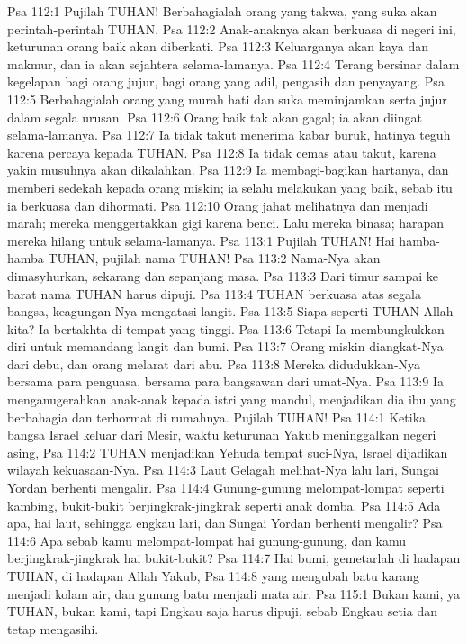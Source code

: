 Psa 112:1  Pujilah TUHAN! Berbahagialah orang yang takwa, yang suka akan perintah-perintah TUHAN.
Psa 112:2  Anak-anaknya akan berkuasa di negeri ini, keturunan orang baik akan diberkati.
Psa 112:3  Keluarganya akan kaya dan makmur, dan ia akan sejahtera selama-lamanya.
Psa 112:4  Terang bersinar dalam kegelapan bagi orang jujur, bagi orang yang adil, pengasih dan penyayang.
Psa 112:5  Berbahagialah orang yang murah hati dan suka meminjamkan serta jujur dalam segala urusan.
Psa 112:6  Orang baik tak akan gagal; ia akan diingat selama-lamanya.
Psa 112:7  Ia tidak takut menerima kabar buruk, hatinya teguh karena percaya kepada TUHAN.
Psa 112:8  Ia tidak cemas atau takut, karena yakin musuhnya akan dikalahkan.
Psa 112:9  Ia membagi-bagikan hartanya, dan memberi sedekah kepada orang miskin; ia selalu melakukan yang baik, sebab itu ia berkuasa dan dihormati.
Psa 112:10  Orang jahat melihatnya dan menjadi marah; mereka menggertakkan gigi karena benci. Lalu mereka binasa; harapan mereka hilang untuk selama-lamanya.
Psa 113:1  Pujilah TUHAN! Hai hamba-hamba TUHAN, pujilah nama TUHAN!
Psa 113:2  Nama-Nya akan dimasyhurkan, sekarang dan sepanjang masa.
Psa 113:3  Dari timur sampai ke barat nama TUHAN harus dipuji.
Psa 113:4  TUHAN berkuasa atas segala bangsa, keagungan-Nya mengatasi langit.
Psa 113:5  Siapa seperti TUHAN Allah kita? Ia bertakhta di tempat yang tinggi.
Psa 113:6  Tetapi Ia membungkukkan diri untuk memandang langit dan bumi.
Psa 113:7  Orang miskin diangkat-Nya dari debu, dan orang melarat dari abu.
Psa 113:8  Mereka didudukkan-Nya bersama para penguasa, bersama para bangsawan dari umat-Nya.
Psa 113:9  Ia menganugerahkan anak-anak kepada istri yang mandul, menjadikan dia ibu yang berbahagia dan terhormat di rumahnya. Pujilah TUHAN!
Psa 114:1  Ketika bangsa Israel keluar dari Mesir, waktu keturunan Yakub meninggalkan negeri asing,
Psa 114:2  TUHAN menjadikan Yehuda tempat suci-Nya, Israel dijadikan wilayah kekuasaan-Nya.
Psa 114:3  Laut Gelagah melihat-Nya lalu lari, Sungai Yordan berhenti mengalir.
Psa 114:4  Gunung-gunung melompat-lompat seperti kambing, bukit-bukit berjingkrak-jingkrak seperti anak domba.
Psa 114:5  Ada apa, hai laut, sehingga engkau lari, dan Sungai Yordan berhenti mengalir?
Psa 114:6  Apa sebab kamu melompat-lompat hai gunung-gunung, dan kamu berjingkrak-jingkrak hai bukit-bukit?
Psa 114:7  Hai bumi, gemetarlah di hadapan TUHAN, di hadapan Allah Yakub,
Psa 114:8  yang mengubah batu karang menjadi kolam air, dan gunung batu menjadi mata air.
Psa 115:1  Bukan kami, ya TUHAN, bukan kami, tapi Engkau saja harus dipuji, sebab Engkau setia dan tetap mengasihi.
